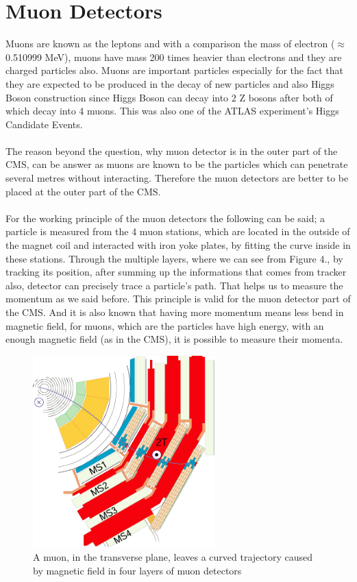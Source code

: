 \documentclass[a4paper,10pt]{article}
\begin{document}
\section{Muon Detectors}

Muons are known as the leptons and with a comparison the mass of electron
($\approx$0.510999 MeV), muons have mass 200 times heavier than electrons
and they are charged particles also. Muons are important particles 
especially for the fact that they are expected to be produced in the
decay of new particles and also Higgs Boson construction since Higgs
Boson can decay into 2 Z bosons after both of which decay into 4 muons. This was also one of the
ATLAS experiment's Higgs Candidate Events.
\\\\
The reason beyond the question, why muon detector is in the outer part
of the CMS, can be answer as muons are known to be the particles which
can penetrate several metres without interacting. Therefore the muon 
detectors are better to be placed at the outer part of the CMS.
\\\\
For the working principle of the muon detectors the following can be said; a particle is measured from the 4 muon stations, which are
located in the outside of the magnet  coil and interacted with iron yoke plates, by fitting the curve inside in these stations.
Through the multiple layers, where we can see from Figure 4., by tracking its position, after summing up the informations that comes from tracker
also, detector can precisely trace a particle's path. That helps us to measure the momentum as we said before. This principle is valid for 
the muon detector part of the CMS. And it is also known that having more momentum means less bend in magnetic field, for muons, which are
the particles have high energy, with an enough magnetic field (as in the CMS), it is possible to measure their momenta.

\begin{figure}[H]
\begin{center}
\includegraphics[width=7cm]{ll.png}
\end{center}
\caption{A muon, in the transverse plane, leaves a curved trajectory caused by magnetic field in four layers of muon detectors }
\end{figure}
\end{document}
